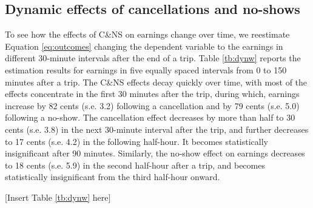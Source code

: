 \documentclass[reviewmode,AEJ]{AEA}
\begin{document}
\subsection{Dynamic effects of cancellations and no-shows}
To see how the effects of C\&NS on earnings change over time, we reestimate Equation \eqref{eq:outcomes} changing the dependent variable to the earnings in different 30-minute intervals after the end of a trip. Table \ref{tb:dynw} reports the estimation results for earnings in five equally spaced intervals from 0 to 150 minutes after a trip. The C\&NS effects decay quickly over time, with most of the effects concentrate in the first 30 minutes after the trip, during which, earnings increase by 82 cents (s.e. 3.2) following a cancellation and by 79 cents (s.e. 5.0) following a no-show. The cancellation effect decreases by more than half to 30 cents (s.e. 3.8) in the next 30-minute interval after the trip, and further decreases to 17 cents (s.e. 4.2) in the following half-hour. It becomes statistically insignificant after 90 minutes. Similarly, the no-show effect on earnings decreases to 18 cents (s.e. 5.9) in the second half-hour after a trip, and becomes statistically insignificant from the third half-hour onward.


\begin{center}
	[Insert Table \ref{tb:dynw} here]
\end{center}


\end{document}
